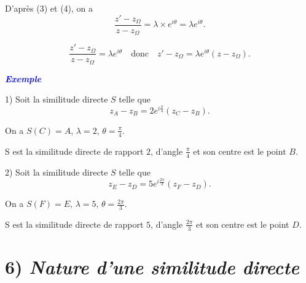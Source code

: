 \documentclass{article}
\begin{document}
D’après (3) et (4), on a 
\[
\frac{z' - z_{\Omega}}{z - z_{\Omega}} = \lambda \times e^{i\theta} = \lambda e^{i\theta}.
\]

\[
\frac{z' - z_{\Omega}}{z - z_{\Omega}} = \lambda e^{i\theta} \quad \text{donc} \quad z' - z_{\Omega} = \lambda e^{i\theta} (z - z_{\Omega}).
\]

\textbf{\textcolor{blue}{\textit{Exemple}}}

\vspace{0.3cm}

1) Soit la similitude directe \( S \) telle que 
\[
z_A - z_B = 2 e^{i \frac{\pi}{4}} (z_C - z_B).
\]

On a \quad \( S(C) = A \), \quad \( \lambda = 2 \), \quad \( \theta = \frac{\pi}{4} \).

S est la similitude directe de rapport \( 2 \), d’angle \( \frac{\pi}{4} \) et son centre est le point \( B \).

\vspace{0.5cm}

2) Soit la similitude directe \( S \) telle que 
\[
z_E - z_D = 5 e^{i \frac{2\pi}{3}} (z_F - z_D).
\]

On a \quad \( S(F) = E \), \quad \( \lambda = 5 \), \quad \( \theta = \frac{2\pi}{3} \).

S est la similitude directe de rapport \( 5 \), d’angle \( \frac{2\pi}{3} \) et son centre est le point \( D \).


\vspace{0.5cm}

\section*{6) \textit{Nature d’une similitude directe}}
\end{document}
